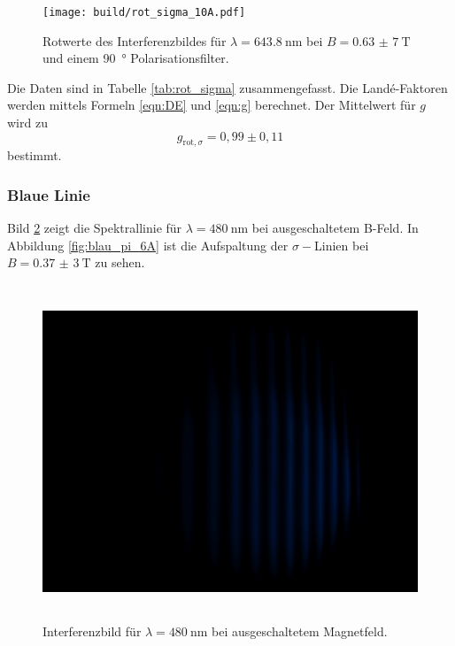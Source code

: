 \begin{figure}[htb]
  \centering
  \texttt{[image: build/rot\_sigma\_10A.pdf]}
  \caption{Rotwerte des Interferenzbildes für $\lambda=\SI{643,8}{\nano\meter}$ bei $B=\SI{0,63(7)}{\tesla}$ und einem \SI{90}{\degree} Polarisationsfilter.}
  \label{fig:rot_sigma_10A_plot}
\end{figure}
Die Daten sind in Tabelle \ref{tab:rot_sigma} zusammengefasst.
Die Landé-Faktoren werden mittels Formeln \eqref{eqn:DE} und \eqref{eqn:g} berechnet.
Der Mittelwert für $g$ wird zu 
\begin{equation}
\label{eqn:g_rot_sigma}
g_{\text{rot},\sigma}=0,99\pm0,11
\end{equation}
bestimmt.

\FloatBarrier
\subsubsection{Blaue Linie}
Bild \ref{fig:blau_pi_0A} zeigt die Spektrallinie für $\lambda=\SI{480}{\nano\meter}$ bei ausgeschaltetem B-Feld.
In Abbildung \ref{fig:blau_pi_6A} ist die Aufspaltung der $\sigma-$Linien bei $B=\SI{0,37(3)}{\tesla}$ zu sehen.
\begin{figure}[htb]
  \centering
  \includegraphics[height=10cm]{content/pictures/blau_pi_0A.JPG}
  \caption{Interferenzbild für $\lambda=\SI{480}{\nano\meter}$ bei ausgeschaltetem Magnetfeld.}
  \label{fig:blau_pi_0A}
\end{figure}
